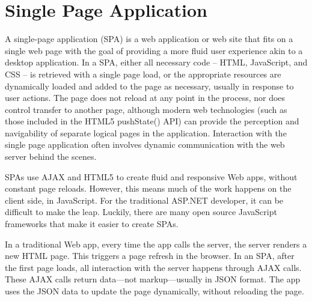 \section{Single Page Application}
\label{sec:ARC_overview}

A single-page application (SPA) is a web application or web site that fits on a single web page with the goal of providing a more fluid user experience akin to a desktop application. In a SPA, either all necessary code – HTML, JavaScript, and CSS – is retrieved with a single page load,\cite{arc_asp} or the appropriate resources are dynamically loaded and added to the page as necessary, usually in response to user actions. The page does not reload at any point in the process, nor does control transfer to another page, although modern web technologies (such as those included in the HTML5 pushState() API) can provide the perception and navigability of separate logical pages in the application. Interaction with the single page application often involves dynamic communication with the web server behind the scenes.

SPAs use AJAX and HTML5 to create fluid and responsive Web apps, without constant page reloads. However, this means much of the work happens on the client side, in JavaScript. For the traditional ASP.NET developer, it can be difficult to make the leap. Luckily, there are many open source JavaScript frameworks that make it easier to create SPAs.

In a traditional Web app, every time the app calls the server, the server renders a new HTML page. This triggers a page refresh in the browser.
In an SPA, after the first page loads, all interaction with the server happens through AJAX calls. These AJAX calls return data—not markup—usually in JSON format. The app uses the JSON data to update the page dynamically, without reloading the page.

